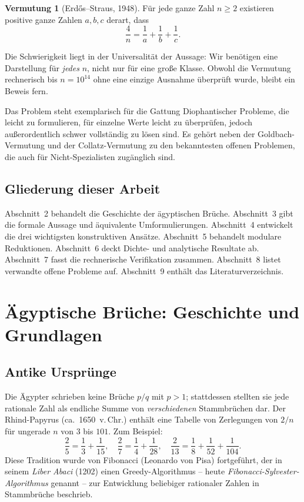 \documentclass[12pt,a4paper]{amsart}
\theoremstyle{definition}
\newtheorem{conjecture}[theorem]{Vermutung}
\begin{document}
\begin{conjecture}[Erd\H{o}s--Straus, 1948]\label{verm:ES}
Für jede ganze Zahl $n \geq 2$ existieren positive ganze Zahlen
$a, b, c$ derart, dass
\[
  \frac{4}{n} = \frac{1}{a} + \frac{1}{b} + \frac{1}{c}.
\]
\end{conjecture}

Die Schwierigkeit liegt in der Universalität der Aussage: Wir benötigen
eine Darstellung für \emph{jedes} $n$, nicht nur für eine große Klasse.
Obwohl die Vermutung rechnerisch bis $n = 10^{14}$ ohne eine einzige
Ausnahme überprüft wurde, bleibt ein Beweis fern.

Das Problem steht exemplarisch für die Gattung Diophantischer Probleme,
die leicht zu formulieren, für einzelne Werte leicht zu überprüfen,
jedoch außerordentlich schwer vollständig zu lösen sind.
Es gehört neben der Goldbach-Vermutung und der Collatz-Vermutung zu den
bekanntesten offenen Problemen, die auch für Nicht-Spezialisten zugänglich sind.

\subsection*{Gliederung dieser Arbeit}

Abschnitt~2 behandelt die Geschichte der ägyptischen Brüche.
Abschnitt~3 gibt die formale Aussage und äquivalente Umformulierungen.
Abschnitt~4 entwickelt die drei wichtigsten konstruktiven Ansätze.
Abschnitt~5 behandelt modulare Reduktionen.
Abschnitt~6 deckt Dichte- und analytische Resultate ab.
Abschnitt~7 fasst die rechnerische Verifikation zusammen.
Abschnitt~8 listet verwandte offene Probleme auf.
Abschnitt~9 enthält das Literaturverzeichnis.

\section{Ägyptische Brüche: Geschichte und Grundlagen}

\subsection{Antike Ursprünge}

Die Ägypter schrieben keine Brüche $p/q$ mit $p > 1$; stattdessen
stellten sie jede rationale Zahl als endliche Summe von
\emph{verschiedenen} Stammbrüchen dar.  Der Rhind-Papyrus
(ca.\ 1650~v.\,Chr.) enthält eine Tabelle von Zerlegungen von $2/n$
für ungerade $n$ von $3$ bis $101$.  Zum Beispiel:
\[
  \frac{2}{5} = \frac{1}{3} + \frac{1}{15}, \quad
  \frac{2}{7} = \frac{1}{4} + \frac{1}{28}, \quad
  \frac{2}{13} = \frac{1}{8} + \frac{1}{52} + \frac{1}{104}.
\]
Diese Tradition wurde von Fibonacci (Leonardo von Pisa) fortgeführt,
der in seinem \emph{Liber Abaci} (1202) einen Greedy-Algorithmus --
heute \emph{Fibonacci-Sylvester-Algorithmus} genannt -- zur Entwicklung
beliebiger rationaler Zahlen in Stammbrüche beschrieb.
\end{document}
